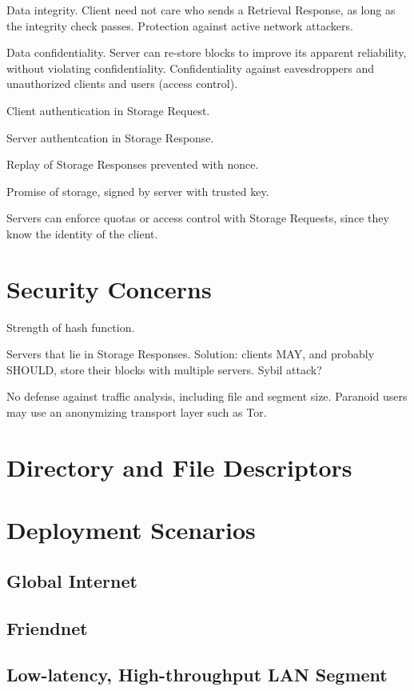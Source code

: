 \documentclass[letterpaper,9pt,twocolumn]{article}
\begin{document}
Data integrity. Client need not care who sends a Retrieval Response, as long
as the integrity check passes. Protection against active network attackers.

Data confidentiality. Server can re-store blocks to improve its apparent
reliability, without violating confidentiality. Confidentiality against
eavesdroppers and unauthorized clients and users (access control).

Client authentication in Storage Request.

Server authentcation in Storage Response.

Replay of Storage Responses prevented with nonce.

Promise of storage, signed by server with trusted key.

Servers can enforce quotas or access control with Storage Requests, since
they know the identity of the client.


\section{Security Concerns}

Strength of hash function.

Servers that lie in Storage Responses. Solution: clients MAY, and probably
SHOULD, store their blocks with multiple servers. Sybil attack?

No defense against traffic analysis, including file and segment size.
Paranoid users may use an anonymizing transport layer such as Tor.


\section{Directory and File Descriptors}


\section{Deployment Scenarios}

\subsection{Global Internet}

\subsection{Friendnet}

\subsection{Low-latency, High-throughput LAN Segment}
\end{document}
